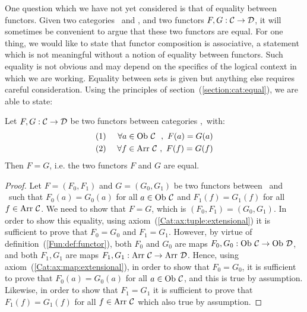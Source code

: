 One question which we have not yet considered is that of equality between
functors. Given two categories \Cat\ and \Dat, and two functors $F,G:\mbox{$\cal C$}\to\mbox{$\cal D$}$, 
it will sometimes be convenient to argue that these two functors are equal. For one 
thing, we would like to state that functor composition is associative, a statement 
which is not meaningful without a notion of equality between functors. Such equality
is not obvious and may depend on the specifics of the logical context in 
which we are working. Equality between sets is given but anything else requires
careful consideration. Using the principles of section~(\ref{section:cat:equal}), 
we are able to state: 

\begin{prop}\label{Fun:prop:equal}
    Let $F,G:\mbox{$\cal C$}\to\mbox{$\cal D$}$ be two functors between categories \Cat,\Dat\ with:
        \begin{eqnarray*}
            (1)&\ &\forall a\in\mbox{\rm Ob}\ \mbox{$\cal C$}\ \ ,\ F(a)=G(a)\\
            (2)&\ &\forall f\in\mbox{\rm Arr}\ \mbox{$\cal C$}\ ,\ F(f)=G(f)
        \end{eqnarray*}
Then $F=G$, i.e. the two functors $F$ and $G$ are equal.
\end{prop}
\begin{proof}
    Let $F=(F_{0},F_{1})$ and $G=(G_{0},G_{1})$ be two functors between \Cat\
    and \Dat\ such that $F_{0}(a)=G_{0}(a)$ for all $a\in\mbox{\rm Ob}\ \mbox{$\cal C$}$ and 
    $F_{1}(f)=G_{1}(f)$ for all $f\in\mbox{\rm Arr}\ \mbox{$\cal C$}$. We need to show that 
    $F=G$, which is $(F_{0},F_{1})=(G_{0},G_{1})$. In order to show this
    equality, using axiom~(\ref{Cat:ax:tuple:extensional}) it is sufficient
    to prove that $F_{0}=G_{0}$ and $F_{1}=G_{1}$. However, by virtue of
    definition~(\ref{Fun:def:functor}), both $F_{0}$ and $G_{0}$ are
    maps $F_{0},G_{0}:\ob\ \Cat\to\ob\ \Dat$, and both $F_{1},G_{1}$
    are maps $F_{1},G_{1}:\arr\ \Cat\to\arr\ \Dat$. Hence, using
    axiom~(\ref{Cat:ax:map:extensional}), in order to show that $F_{0}=G_{0}$,
    it is sufficient to prove that $F_{0}(a)=G_{0}(a)$ for all $a\in\mbox{\rm Ob}\ \mbox{$\cal C$}$,
    and this is true by assumption. Likewise, in order to show that
    $F_{1}=G_{1}$ it is sufficient to prove that $F_{1}(f)=G_{1}(f)$
    for all $f\in\mbox{\rm Arr}\ \mbox{$\cal C$}$ which also true by assumption.
\end{proof}


